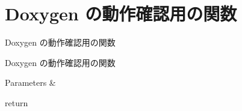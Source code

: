 \chapter{Doxygen の動作確認用の関数}
\hypertarget{index}{}\label{index}
Doxygen の動作確認用の関数

Doxygen の動作確認用の関数   


\begin{DoxyParams}{Parameters}
{\em } & \\
\hline
\end{DoxyParams}
return 